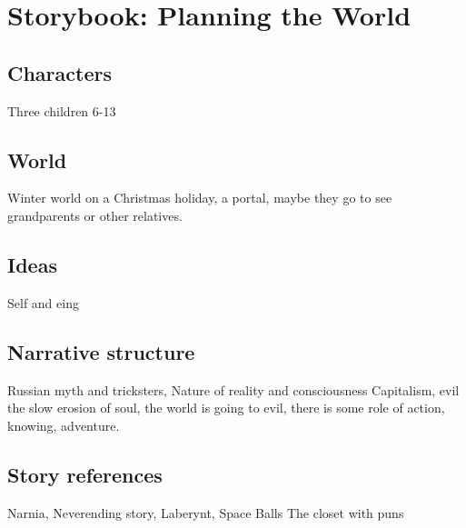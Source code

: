 \documentclass[12pt,openany]{book}      %
\title{\booktitle}
\author{\authorname}
\begin{document}
\frontmatter
% 
% 

\mainmatter
\pagestyle{fancy}
% 


\chapter{Storybook: Planning the World}


\section{Characters}
Three children 6-13

\section{World}
Winter world on a Christmas holiday, a portal, maybe they go to see grandparents or other relatives.

\section{Ideas}
Self and eing

\section{Narrative structure}
Russian myth and tricksters,
Nature of reality and consciousness
Capitalism, evil the slow erosion of soul, the world is going to evil, there is some role of action, knowing, adventure. 

\section{Story references}
Narnia, 
Neverending story, Laberynt, Space Balls
The closet with puns
\end{document}

